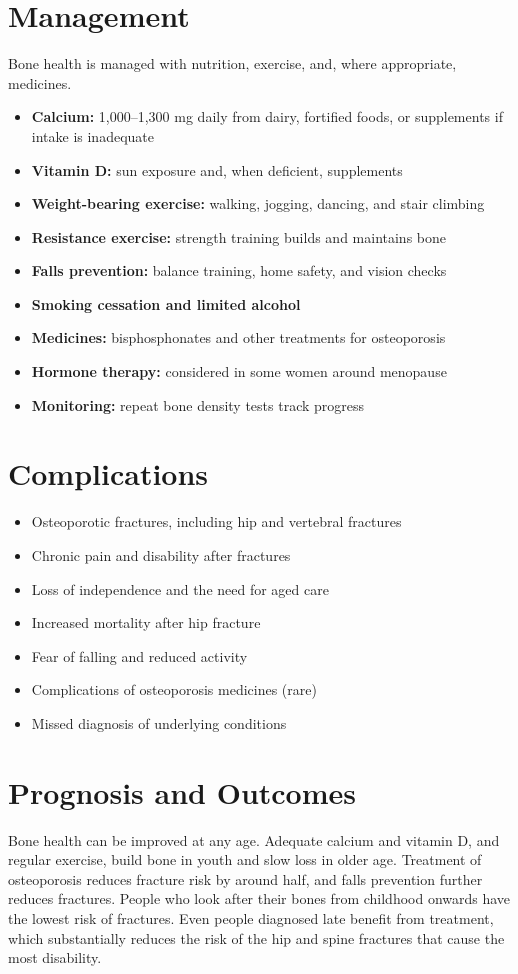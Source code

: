 \section*{Management}
Bone health is managed with nutrition, exercise, and, where appropriate, medicines.

\begin{itemize}
    \item \textbf{Calcium:} 1,000--1,300 mg daily from dairy, fortified foods, or supplements if intake is inadequate
    \item \textbf{Vitamin D:} sun exposure and, when deficient, supplements
    \item \textbf{Weight-bearing exercise:} walking, jogging, dancing, and stair climbing
    \item \textbf{Resistance exercise:} strength training builds and maintains bone
    \item \textbf{Falls prevention:} balance training, home safety, and vision checks
    \item \textbf{Smoking cessation and limited alcohol}
    \item \textbf{Medicines:} bisphosphonates and other treatments for osteoporosis
    \item \textbf{Hormone therapy:} considered in some women around menopause
    \item \textbf{Monitoring:} repeat bone density tests track progress
\end{itemize}

\section*{Complications}
\begin{itemize}
    \item Osteoporotic fractures, including hip and vertebral fractures
    \item Chronic pain and disability after fractures
    \item Loss of independence and the need for aged care
    \item Increased mortality after hip fracture
    \item Fear of falling and reduced activity
    \item Complications of osteoporosis medicines (rare)
    \item Missed diagnosis of underlying conditions
\end{itemize}

\section*{Prognosis and Outcomes}
Bone health can be improved at any age. Adequate calcium and vitamin D, and regular exercise, build bone in youth and slow loss in older age. Treatment of osteoporosis reduces fracture risk by around half, and falls prevention further reduces fractures. People who look after their bones from childhood onwards have the lowest risk of fractures. Even people diagnosed late benefit from treatment, which substantially reduces the risk of the hip and spine fractures that cause the most disability.

